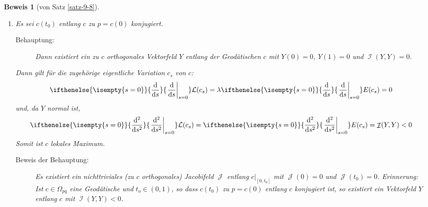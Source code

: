\documentclass[paper=A4, twoside, chapterprefix=true, bibliography=totoc, headsepline]{scrbook}
\let\temp\phi{}
\let\phi\varphi{}
\let\varphi\temp{}
\let\temp\theta{}
\let\theta\vartheta{}
\let\vartheta\temp{}
\let\temp\epsilon{}
\let\epsilon\varepsilon{}
\let\varepsilon\temp{}
\let\temp\rho{}
\let\rho\varrho{}
\let\varrho\temp{}
\DeclareMathOperator{\calI}{\mathcal{I}}
\DeclareMathOperator{\calJ}{\mathcal{J}}
\newcommand{\dop}{\mathrm{d}}
\newcommand{\X}{\times}
\newcommand{\difffrac}[3][]{\ifthenelse{\isempty{#1}}{\frac{\dop #2}{\dop #3}}{\left. \frac{\dop #2}{\dop #3} \right|_{#1}}}
\theoremstyle{plain}
\theoremstyle{nonumberplain}
\newtheorem{bew}{Beweis}
\theoremstyle{empty}
\theoremstyle{break}
\begin{document}
\begin{bew}[von Satz \ref{satz-9-8}]
\begin{enumerate}[label=(\roman*),leftmargin=*,widest=ii]
\begin{center}
\end{center}
    Es sei $t_i$ eine Partition von $[0,1]$, so dass $\phi([t_{i-1},t_i]) \subseteq W_i$. Ist $c_s$ eine Variation von $c$, so kann $\epsilon > 0$ so gew\"ahlt werden, dass
    \begin{align*}
      c_s \colon [t_{i-1},t_i]\X(-\epsilon,\epsilon) \to U_i = \exp_p(W_i)
    \end{align*}
    gilt. Dies definiert eine Variation $\psi_s$ von $\phi$ wie folgt:
    Ist $\psi_s$ bis $t_{i-1}$ definiert und gilt $\psi_s(t_{i-1}) \in W_i$, so setzt man $\psi_s(t) = \exp_p|_{W_i}^{-1}(c_s(t))$.
    Nach Lemma \ref{thm:lemma-9-10} gilt also
    \begin{align*}
      \mathcal L(\exp_p\circ \psi_s) = \mathcal L(c_s) \geq \mathcal L(c)
    \end{align*}
    f\"ur alle $s$. Mit der Cauchy-Schwarz Ungleichung folgt dann:
    \begin{align*}
      E(c_s) \geq \frac{1}{2} \mathcal L(c_s)^2 \geq \frac{1}{2} \mathcal
      L(c)^2 = E(c)
    \end{align*}
  \item
    Es sei $c(t_0)$ entlang $c$ zu $p = c(0)$ konjugiert.
    
    \begin{description}\item[Behauptung:] Dann existiert ein zu $c$ orthogonales Vektorfeld $Y$ entlang der Geod\"atischen $c$ mit $Y(0) = 0$, $Y(1) = 0$ und $\calI(Y,Y) = 0$.\end{description}
    Dann gilt f\"ur die zugeh\"orige eigentliche Variation $c_s$ von $c$:
    \begin{align*}
      \difffrac[s=0]{}{s}\mathcal L(c_s) = \lambda
      \difffrac[s=0]{}{s}E(c_s) = 0
    \end{align*}
    und, da $Y$ normal ist,
    \begin{align*}
      \difffrac[s=0]{^2}{s^2}\mathcal L(c_s) = \difffrac[s=0]{^2}{s^2}
      E(c_s) = \calI(Y,Y) < 0
    \end{align*}
    Somit ist $c$ lokales Maximum.
    \begin{description}\item[Beweis der Behauptung:]
      Es existiert ein nichttriviales (zu $c$ orthogonales) Jacobifeld $\calJ$ entlang $c|_{[0,t_0]}$ mit $\calJ(0) = 0$ und $\calJ(t_0) = 0$.
      \emph{Erinnerung:} Ist $c \in \Omega_{pq}$ eine Geod\"atische und $t_o \in (0,1)$, so dass $c(t_0)$ zu $p = c(0)$ entlang $c$ konjugiert ist, so existiert ein Vektorfeld $Y$ entlang $c$ mit $\calI(Y,Y) < 0$.


\end{description}
\end{enumerate}
\end{bew}
\end{document}
